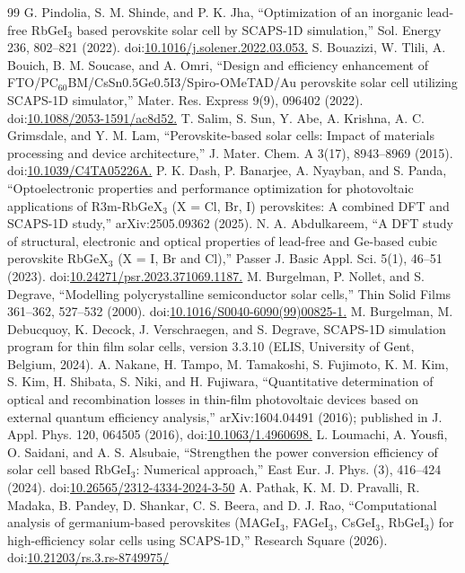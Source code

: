 \documentclass[review]{elsarticle}
\begin{document}
\begin{thebibliography}{99}
 G. Pindolia, S. M. Shinde, and P. K. Jha, ``Optimization of an inorganic lead-free RbGeI$_{3}$ based perovskite solar cell by SCAPS-1D simulation,'' Sol. Energy 236, 802--821 (2022). doi:\url{10.1016/j.solener.2022.03.053.}
 S. Bouazizi, W. Tlili, A. Bouich, B. M. Soucase, and A. Omri, ``Design and efficiency enhancement of FTO/\allowbreak{}PC$_{60}$BM/CsSn0.5Ge0.5I3/\allowbreak{}Spiro-OMeTAD/\allowbreak{}Au perovskite solar cell utilizing SCAPS-1D simulator,'' Mater. Res. Express 9(9), 096402 (2022). doi:\url{10.1088/2053-1591/ac8d52.}
 T. Salim, S. Sun, Y. Abe, A. Krishna, A. C. Grimsdale, and Y. M. Lam, ``Perovskite-based solar cells: Impact of materials processing and device architecture,'' J. Mater. Chem. A 3(17), 8943--8969 (2015). doi:\url{10.1039/C4TA05226A.}
 P. K. Dash, P. Banarjee, A. Nyayban, and S. Panda, ``Optoelectronic properties and performance optimization for photovoltaic applications of R3m-RbGeX$_{3}$ (X = Cl, Br, I) perovskites: A combined DFT and SCAPS-1D study,'' arXiv:2505.09362 (2025).
 N. A. Abdulkareem, ``A DFT study of structural, electronic and optical properties of lead-free and Ge-based cubic perovskite RbGeX$_{3}$ (X = I, Br and Cl),'' Passer J. Basic Appl. Sci. 5(1), 46--51 (2023). doi:\url{10.24271/psr.2023.371069.1187.}
 M. Burgelman, P. Nollet, and S. Degrave, ``Modelling polycrystalline semiconductor solar cells,'' Thin Solid Films 361--362, 527--532 (2000). doi:\url{10.1016/S0040-6090(99)00825-1.}
 M. Burgelman, M. Debucquoy, K. Decock, J. Verschraegen, and S. Degrave, SCAPS-1D simulation program for thin film solar cells, version 3.3.10 (ELIS, University of Gent, Belgium, 2024).
 A. Nakane, H. Tampo, M. Tamakoshi, S. Fujimoto, K. M. Kim, S. Kim, H. Shibata, S. Niki, and H. Fujiwara, ``Quantitative determination of optical and recombination losses in thin-film photovoltaic devices based on external quantum efficiency analysis,'' arXiv:1604.04491 (2016); published in J. Appl. Phys. 120, 064505 (2016), doi:\url{10.1063/1.4960698.}
 L. Loumachi, A. Yousfi, O. Saidani, and A. S. Alsubaie, ``Strengthen the power conversion efficiency of solar cell based RbGeI$_{3}$: Numerical approach,'' East Eur. J. Phys. (3), 416--424 (2024). doi:\url{10.26565/2312-4334-2024-3-50}
 A. Pathak, K. M. D. Pravalli, R. Madaka, B. Pandey, D. Shankar, C. S. Beera, and D. J. Rao, ``Computational analysis of germanium-based perovskites (MAGeI$_{3}$, FAGeI$_{3}$, CsGeI$_{3}$, RbGeI$_{3}$) for high-efficiency solar cells using SCAPS-1D,'' Research Square (2026). doi:\url{10.21203/rs.3.rs-8749975/}

\end{thebibliography}
\end{document}
